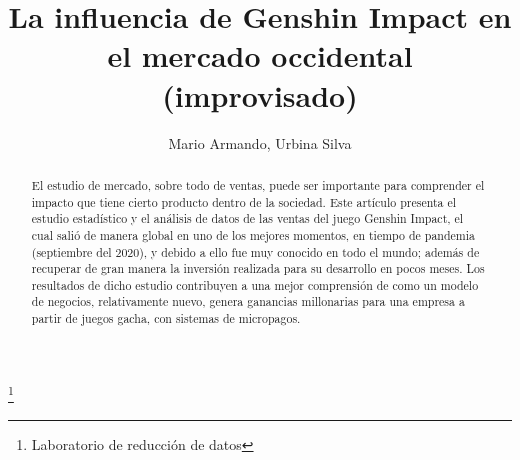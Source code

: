 \documentclass[osajnl,twocolumn,showpacs,superscriptaddress,10pt]{revtex4-2}
\begin{document}
\providecommand{\sumat}[3]{\ensuremath{\sum_{#1}^{#2}{\left\{\hspace{2pt} #3 \hspace{2pt}\right\}}}}
\providecommand{\suma}[3]{\ensuremath{\sum_{#1}^{#2}{#3}}}
\providecommand{\Rarr}[1]{\ensuremath{\hs{#1}\Longrightarrow\hs{#1}}}
\providecommand{\rarr}[1]{\ensuremath{\hs{#1}\longrightarrow\hs{#1}}}

\providecommand{\expo}[1]{\ensuremath{e^{#1}}}
\providecommand{\uvec}[1]{\ensuremath{\hat{#1}}}

\title{La influencia de Genshin Impact en el mercado occidental (improvisado)}
\thanks{Laboratorio de reducción de datos}

\author{Mario Armando, Urbina Silva}
%
\begin{abstract}
    El estudio de mercado, sobre todo de ventas, puede ser importante para comprender el impacto que tiene cierto producto dentro de la sociedad. Este artículo presenta el estudio estadístico y el análisis de datos de las ventas del juego Genshin Impact, el cual salió de manera global en uno de los mejores momentos, en tiempo de pandemia (septiembre del 2020), y debido a ello fue muy conocido en todo el mundo; además de recuperar de gran manera la inversión realizada para su desarrollo en pocos meses. Los resultados de dicho estudio contribuyen a una mejor comprensión de como un modelo de negocios, relativamente nuevo, genera ganancias millonarias para una empresa a partir de juegos gacha, con sistemas de micropagos.
\end{abstract}
\maketitle
\end{document}
